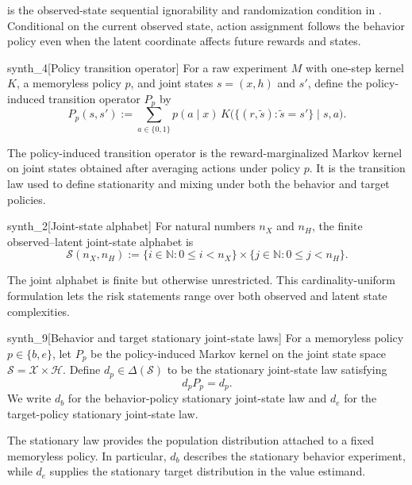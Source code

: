 \documentclass[11pt]{article}
\begin{document}
 is the observed-state sequential ignorability and randomization condition in \citet{HuWager2023}. Conditional on the current observed state, action assignment follows the behavior policy even when the latent coordinate affects future rewards and states.

\begin{definitionv}{synth_4}[Policy transition operator]
For a raw experiment \(M\) with one-step kernel \(K\), a memoryless policy \(p\), and joint states \(s=(x,h)\) and \(s'\), define the policy-induced transition operator \(P_p\) by
\[
P_p(s,s')
:=
\sum_{a\in\{0,1\}}
p(a\mid x)\,
K\bigl(\{(r,\widetilde s): \widetilde s=s'\}\mid s,a\bigr).
\]
\end{definitionv}

The policy-induced transition operator  is the reward-marginalized Markov kernel on joint states obtained after averaging actions under policy \(p\). It is the transition law used to define stationarity and mixing under both the behavior and target policies.

\begin{definitionv}{synth_2}[Joint-state alphabet]
For natural numbers \(n_X\) and \(n_H\), the finite observed--latent joint-state alphabet is
\[
\mathcal S(n_X,n_H)
:=
\{i\in\mathbb N: 0\le i<n_X\}
\times
\{j\in\mathbb N: 0\le j<n_H\}.
\]
\end{definitionv}

The joint alphabet  is finite but otherwise unrestricted. This cardinality-uniform formulation lets the risk statements range over both observed and latent state complexities.

\begin{definitionv}{synth_9}[Behavior and target stationary joint-state laws]
For a memoryless policy \(p\in\{b,e\}\), let \(P_p\) be the policy-induced Markov kernel on the joint state space \(\mathcal S=\mathcal X\times\mathcal H\). Define \(d_p\in\Delta(\mathcal S)\) to be the stationary joint-state law satisfying
\[
d_pP_p=d_p .
\]
We write \(d_b\) for the behavior-policy stationary joint-state law and \(d_e\) for the target-policy stationary joint-state law.
\end{definitionv}

The stationary law  provides the population distribution attached to a fixed memoryless policy. In particular, \(d_b\) describes the stationary behavior experiment, while \(d_e\) supplies the stationary target distribution in the value estimand.
\end{document}
